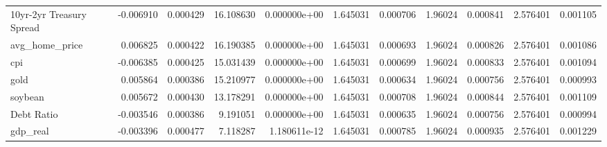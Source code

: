 \documentclass[12pt,a4paper,english]{article}
\begin{document}
{{\begin{tabular}{@{}lrrrrrrrrrr@{}}
			10yr-2yr Treasury Spread      & -0.006910                & 0.000429                    & 16.108630                 & 0.000000e+00                             & 1.645031                      & 0.000706                      & 1.96024                      & 0.000841                     & 2.576401                     & 0.001105                     \\
			avg\_home\_price              & 0.006825                 & 0.000422                    & 16.190385                 & 0.000000e+00                             & 1.645031                      & 0.000693                      & 1.96024                      & 0.000826                     & 2.576401                     & 0.001086                     \\
			cpi                           & -0.006385                & 0.000425                    & 15.031439                 & 0.000000e+00                             & 1.645031                      & 0.000699                      & 1.96024                      & 0.000833                     & 2.576401                     & 0.001094                     \\
			gold                          & 0.005864                 & 0.000386                    & 15.210977                 & 0.000000e+00                             & 1.645031                      & 0.000634                      & 1.96024                      & 0.000756                     & 2.576401                     & 0.000993                     \\
			soybean                       & 0.005672                 & 0.000430                    & 13.178291                 & 0.000000e+00                             & 1.645031                      & 0.000708                      & 1.96024                      & 0.000844                     & 2.576401                     & 0.001109                     \\
			Debt Ratio                    & -0.003546                & 0.000386                    & 9.191051                  & 0.000000e+00                             & 1.645031                      & 0.000635                      & 1.96024                      & 0.000756                     & 2.576401                     & 0.000994                     \\
			gdp\_real                     & -0.003396                & 0.000477                    & 7.118287                  & 1.180611e-12                             & 1.645031                      & 0.000785                      & 1.96024                      & 0.000935                     & 2.576401                     & 0.001229                     \\

\end{tabular}}}
\end{document}
